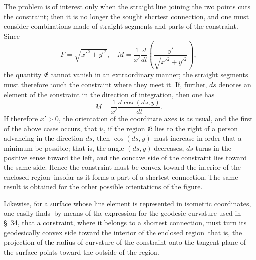\documentclass[11pt,a4paper,leqno]{article}
\begin{document}
The problem is of interest only when the straight line joining the two points cuts the constraint; then it is no longer the sought shortest connection, and one must consider combinations made of straight segments and parts of the constraint. Since
\[
F=\sqrt{x'^2+y'^2},\quad
M=\frac{1}{x'}\frac{d}{dt}\left(\frac{y'}{\sqrt{x'^2+y'^2}}\right),
\]
the quantity $\mathfrak{E}$ cannot vanish in an extraordinary manner; the straight segments must therefore touch the constraint where they meet it. If, further, $ds$ denotes an element of the constraint in the direction of integration, then one has
\[
M=\frac{1}{x'}\frac{d\cos(ds,y)}{dt}.
\]
If therefore $x'>0$, the orientation of the coordinate axes is as usual, and the first of the above cases occurs, that is, if the region $\mathfrak{G}$ lies to the right of a person advancing in the direction $ds$, then $\cos(ds,y)$ must increase in order that a minimum be possible; that is, the angle $(ds,y)$ decreases, $ds$ turns in the positive sense toward the left, and the concave side of the constraint lies toward the same side. Hence the constraint must be convex toward the interior of the enclosed region, insofar as it forms a part of a shortest connection. The same result is obtained for the other possible orientations of the figure.

Likewise, for a surface whose line element is represented in isometric coordinates, one easily finds, by means of the expression for the geodesic curvature used in \S~34, that
a constraint, where it belongs to a shortest connection, must turn its geodesically convex side toward the interior of the enclosed region; that is, the projection of the radius of curvature of the constraint onto the tangent plane of the surface points toward the outside of the region.
\end{document}
